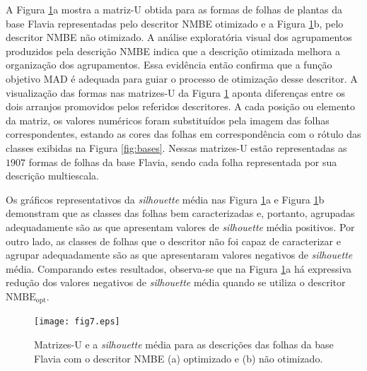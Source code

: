 A Figura \ref{fig:MatrizU_leaves_256}a mostra a matriz-U obtida para as formas de folhas de plantas da base Flavia representadas pelo descritor NMBE otimizado e a Figura \ref{fig:MatrizU_leaves_256}b, pelo descritor NMBE não otimizado. A análise exploratória visual dos agrupamentos produzidos pela descrição NMBE indica que a descrição otimizada melhora a organização dos agrupamentos. Essa evidência então confirma que a função objetivo MAD é adequada para guiar o processo de otimização desse descritor. A visualização das formas nas matrizes-U da Figura \ref{fig:MatrizU_leaves_256}  aponta diferenças entre os dois arranjos promovidos pelos referidos descritores. A cada posição ou elemento da matriz, os valores numéricos foram substituídos pela imagem das folhas correspondentes, estando as cores das folhas em correspondência com o rótulo das classes exibidas na Figura \ref{fig:bases}. Nessas matrizes-U estão representadas as $1907$ formas de folhas da base Flavia, sendo cada folha representada por sua descrição multiescala.

Os gráficos representativos da \emph{silhouette} média nas  Figura \ref{fig:MatrizU_leaves_256}a  e Figura \ref{fig:MatrizU_leaves_256}b demonstram que as classes das folhas bem caracterizadas e, portanto, agrupadas adequadamente são as que apresentam valores de \emph{silhouette} média positivos. Por outro lado, as classes de folhas que o descritor não foi capaz de caracterizar e agrupar adequadamente são as que apresentaram valores negativos de \emph{silhouette} média. Comparando estes resultados, observa-se que na Figura \ref{fig:MatrizU_leaves_256}a há expressiva redução dos valores negativos de \emph{silhouette} média quando se utiliza o descritor $\operatorname{NMBE_{opt}}$. 

\begin{figure}[t]

\caption{\label{fig:MatrizU_leaves_256} Matrizes-U e a \emph{silhouette} média para as descrições das folhas da base Flavia com o descritor NMBE (a) optimizado e (b) não otimizado.}
\centering
\texttt{[image: fig7.eps]}

\end{figure}

